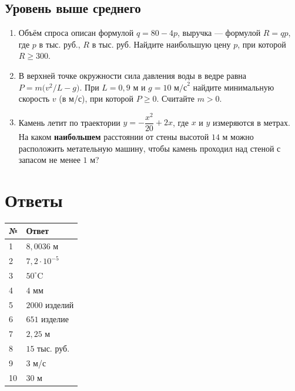 \documentclass[a4paper,11pt]{article}
\begin{document}
\subsection*{Уровень выше среднего}
\begin{enumerate}[label=\textbf{\arabic*.},start=8]
\item Объём спроса описан формулой \(q=80-4p\),
      выручка --- формулой \(R=qp\), где \(p\) в тыс. руб.,
      \(R\) в тыс. руб.
      Найдите наибольшую цену \(p\), при которой \(R\ge300\).
\item В верхней точке окружности сила давления воды в ведре
      равна \(P=m\bigl(v^2/L-g\bigr)\).
      При \(L=0{,}9\) м и \(g=10\text{ м/с}^2\)
      найдите минимальную скорость \(v\) (в м/с),
      при которой \(P\ge0\). Считайте \(m>0\).
\item Камень летит по траектории
      \(y=-\dfrac{x^2}{20}+2x\), где \(x\) и \(y\) измеряются
      в метрах. На каком \textbf{наибольшем} расстоянии
      от стены высотой \(14\) м можно расположить метательную
      машину, чтобы камень проходил над стеной
      с запасом не менее \(1\) м?
\end{enumerate}

\clearpage
\section*{Ответы}
\begin{center}
\begin{tabularx}{.91\linewidth}{@{}p{.15\linewidth}X@{}}
\toprule
№ & Ответ\\
\midrule
1 & \(8{,}0036\) м\\
2 & \(7{,}2\cdot10^{-5}\)\\
3 & \(50^\circ\mathrm C\)\\
4 & \(4\) мм\\
5 & \(2000\) изделий\\
6 & \(651\) изделие\\
7 & \(2{,}25\) м\\
8 & \(15\) тыс. руб.\\
9 & \(3\) м/с\\
10 & \(30\) м\\
\bottomrule
\end{tabularx}
\end{center}

\vspace{1cm}
\end{document}
